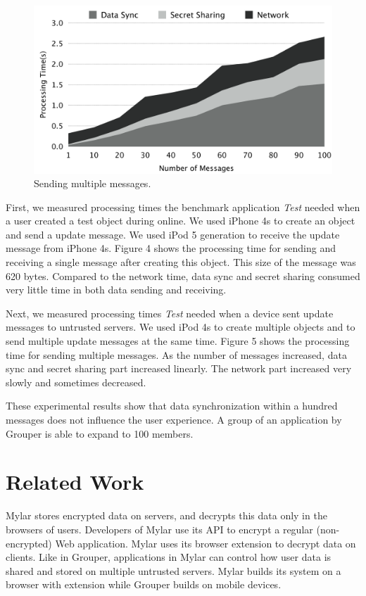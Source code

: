 \documentclass[twocolumn,10pt]{article}
\begin{document}
\begin{figure}[t]
	\centering
	\includegraphics[scale=0.12]{processing2}
	\caption{Sending multiple messages.}
\end{figure}

First, we measured processing times the benchmark application \emph{Test} needed when a user created a test object during online. 
We used iPhone 4s to create an object and send a update message. 
We used iPod 5 generation to receive the update message from iPhone 4s.
Figure 4 shows the processing time for sending and receiving a single message after creating this object.
This size of the message was 620 bytes.
Compared to the network time, data sync and secret sharing consumed very little time in both data sending and receiving.

Next, we measured processing times \emph{Test} needed when a device sent update messages to untrusted servers.
We used iPod 4s to create multiple objects and to send multiple update messages at the same time.
Figure 5 shows the processing time for sending multiple messages. 
As the number of messages increased, data sync and secret sharing part increased linearly. 
The network part increased very slowly and sometimes decreased.

These experimental results show that data synchronization within a hundred messages does not influence the user experience. A group of an application by Grouper is able to expand to 100 members. 

\section{Related Work}

Mylar\cite{popa2014building} stores encrypted data on servers, and decrypts this data only in the browsers of users. 
Developers of Mylar use its API to encrypt a regular (non-encrypted) Web application. 
Mylar uses its browser extension to decrypt data on clients. 
Like in Grouper, applications in Mylar can control how user data is shared and stored on multiple untrusted servers. 
Mylar builds its system on a browser with extension while Grouper builds on mobile devices.
\end{document}
